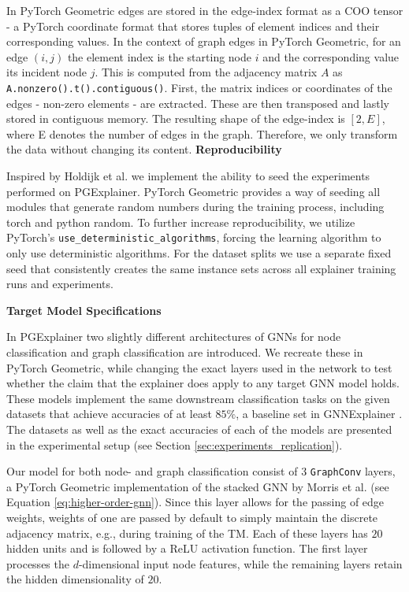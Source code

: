 In PyTorch Geometric edges are stored in the edge-index format as a COO tensor - a PyTorch coordinate format that stores tuples of element indices and their corresponding values. In the context of graph edges in PyTorch Geometric, for an edge $(i,j)$ the element index is the starting node $i$ and the corresponding value its incident node $j$. This is computed from the adjacency matrix $A$ as \lstinline|A.nonzero().t().contiguous()|.
First, the matrix indices or coordinates of the edges - non-zero elements - are extracted. These are then transposed and lastly stored in contiguous memory. The resulting shape of the edge-index is $[2, E]$, where E denotes the number of edges in the graph. Therefore, we only transform the data without changing its content. \bigskip
\newpage
\textbf{Reproducibility}\par
 Inspired by Holdijk et al. \cite{holdijk2021re} we implement the ability to seed the experiments performed on PGExplainer. PyTorch Geometric provides a way of seeding all modules that generate random numbers during the training process, including torch and python random.
To further increase reproducibility, we utilize PyTorch's \lstinline|use_deterministic_algorithms|, forcing the learning algorithm to only use deterministic algorithms. For the dataset splits we use a separate fixed seed that consistently creates the same instance sets across all explainer training runs and experiments.\bigskip

\textbf{Target Model Specifications}\par
 In PGExplainer two slightly different architectures of GNNs for node classification and graph classification are introduced. We recreate these in PyTorch Geometric, while changing the exact layers used in the network to test whether the claim that the explainer does apply to any target GNN model holds. These models implement the same downstream classification tasks on the given datasets that achieve accuracies of at least $85\%$, a baseline set in GNNExplainer \cite{ying2019gnnexplainer}. The datasets as well as the exact accuracies of each of the models are presented in the experimental setup (see Section \ref{sec:experiments_replication}). 

Our model for both node- and graph classification consist of $3$ \lstinline|GraphConv| layers, a PyTorch Geometric implementation of the stacked GNN by Morris et al. \cite{morris2019weisfeiler} (see Equation \ref{eq:higher-order-gnn}). Since this layer allows for the passing of edge weights, weights of one are passed by default to simply maintain the discrete adjacency matrix, e.g., during training of the \ac{TM}. Each of these layers has $20$ hidden units and is followed by a ReLU activation function. The first layer processes the $d$-dimensional input node features, while the remaining layers retain the hidden dimensionality of $20$.

